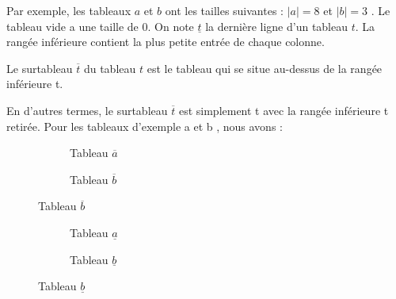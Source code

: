 Par exemple, les tableaux $a$ et $b$ ont les tailles suivantes : $|a| = 8$ et  $|b| = 3$ .
Le tableau vide a une taille de 0. On note $\underline{t}$ la dernière ligne d'un tableau $t$. 
La rangée inférieure contient la plus petite entrée de chaque colonne. 
\begin{definition}[surtableau]
	Le surtableau $\overline{t}$ du tableau $t$  est le tableau qui se situe au-dessus de la rangée inférieure t.
\end{definition} 
En d'autres termes, le surtableau $\overline{t}$ est simplement t avec la rangée inférieure t retirée. Pour les tableaux d'exemple a et b , nous avons : \\
\begin{figure}[!ht]
	\centering
	\begin{subfigure}[b]{0.4\linewidth}
		\centering
		\caption{Tableau $\overline{a}$}
		\label{fig:tab4}
	\end{subfigure}
	\begin{subfigure}[b]{0.4\linewidth}
		\centering
		\caption{Tableau $\overline{b}$}
		\label{fig:tab5}
	\end{subfigure}
	\label{fig:tabs2}
\end{figure}
\begin{figure}[!ht]
	\centering
	\begin{subfigure}[b]{0.4\linewidth}
		\centering
		\caption{Tableau $\underline{a}$}
		\label{fig:tab6}
	\end{subfigure}
	\begin{subfigure}[b]{0.4\linewidth}
		\centering
		\caption{Tableau $\underline{b}$}
		\label{fig:tab7}
	\end{subfigure}
	\label{fig:tabs3}
\end{figure}
